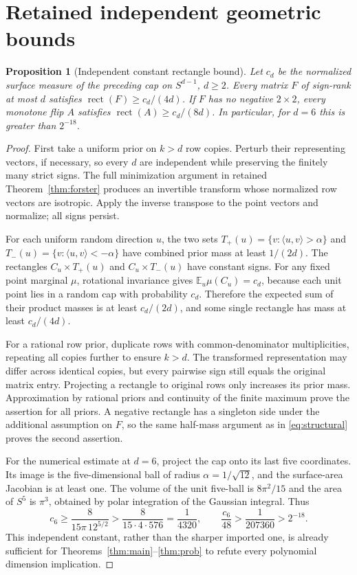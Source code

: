 \documentclass[11pt]{article}
\newtheorem{proposition}[theorem]{Proposition}
\DeclareMathOperator{\rect}{rect}
\newcommand{\E}{\mathbb E}
\newcommand{\1}{\mathbf 1}
\begin{document}
\section{Retained independent geometric bounds}\label{app:oldgeometry}
\setcounter{theorem}{13}
\begin{proposition}[Independent constant rectangle bound]\label{prop:cap-bound}
Let $c_d$ be the normalized surface measure of the preceding cap on $S^{d-1}$, $d\ge2$. Every matrix $F$ of sign-rank at most $d$ satisfies $\rect(F)\ge c_d/(4d)$. If $F$ has no negative $2\times2$, every monotone flip $A$ satisfies $\rect(A)\ge c_d/(8d)$. In particular, for $d=6$ this is greater than $2^{-18}$.
\end{proposition}
\begin{proof}
First take a uniform prior on $k>d$ row copies. Perturb their representing vectors, if necessary, so every $d$ are independent while preserving the finitely many strict signs. The full minimization argument in retained Theorem~\ref{thm:forster} produces an invertible transform whose normalized row vectors are isotropic. Apply the inverse transpose to the point vectors and normalize; all signs persist.

For each uniform random direction $u$, the two sets $T_+(u)=\{v:\langle u,v\rangle>\alpha\}$ and $T_-(u)=\{v:\langle u,v\rangle<-\alpha\}$ have combined prior mass at least $1/(2d)$. The rectangles $C_u\times T_+(u)$ and $C_u\times T_-(u)$ have constant signs. For any fixed point marginal $\mu$, rotational invariance gives $\E_u\mu(C_u)=c_d$, because each unit point lies in a random cap with probability $c_d$. Therefore the expected sum of their product masses is at least $c_d/(2d)$, and some single rectangle has mass at least $c_d/(4d)$.

For a rational row prior, duplicate rows with common-denominator multiplicities, repeating all copies further to ensure $k>d$. The transformed representation may differ across identical copies, but every pairwise sign still equals the original matrix entry. Projecting a rectangle to original rows only increases its prior mass. Approximation by rational priors and continuity of the finite maximum prove the assertion for all priors. A negative rectangle has a singleton side under the additional assumption on $F$, so the same half-mass argument as in \eqref{eq:structural} proves the second assertion.

For the numerical estimate at $d=6$, project the cap onto its last five coordinates. Its image is the five-dimensional ball of radius $\alpha=1/\sqrt{12}$, and the surface-area Jacobian is at least one. The volume of the unit five-ball is $8\pi^2/15$ and the area of $S^5$ is $\pi^3$, obtained by polar integration of the Gaussian integral. Thus
\[
 c_6\ge\frac8{15\pi\,12^{5/2}}>
 \frac8{15\cdot4\cdot576}=\frac1{4320},
 \qquad \frac{c_6}{48}>\frac1{207360}>2^{-18}.
\]
This independent constant, rather than the sharper imported one, is already sufficient for Theorems~\ref{thm:main}--\ref{thm:prob} to refute every polynomial dimension implication.
\end{proof}
\end{document}
